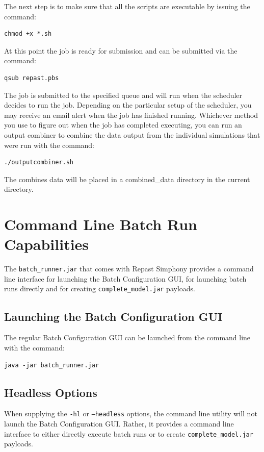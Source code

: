 \documentclass[11pt]{amsart}
\begin{document}
The next step is to make sure that all the scripts are executable by issuing the command:
\begin{verbatim}
chmod +x *.sh
\end{verbatim}
At this point the job is ready for submission and can be submitted via the command:
\begin{verbatim}
qsub repast.pbs
\end{verbatim}

The job is submitted to the specified queue and will run when the scheduler decides to run the job. Depending on the particular setup of the scheduler, you may receive an email alert when the job has finished running. Whichever method you use to figure out when the job has completed executing, you can run an output combiner to combine the data output from the individual simulations that were run with the command:
\begin{verbatim}
./outputcombiner.sh
\end{verbatim}
The combines data will be placed in a combined\_data directory in the current directory.

\section{Command Line Batch Run Capabilities}
The {\tt batch\_runner.jar} that comes with Repast Simphony provides a command line interface for launching the Batch Configuration GUI, for launching batch runs directly and for creating {\tt complete\_model.jar} payloads.

\subsection{Launching the Batch Configuration GUI}
The regular Batch Configuration GUI can be launched from the command line with the command:
\begin{verbatim}
java -jar batch_runner.jar
\end{verbatim}


\subsection{Headless Options}
When supplying the {\tt-hl} or {\tt--headless} options, the command line utility will not launch the Batch Configuration GUI. Rather, it provides a command line interface to either directly execute batch runs or to create  {\tt complete\_model.jar} payloads.
\end{document}
